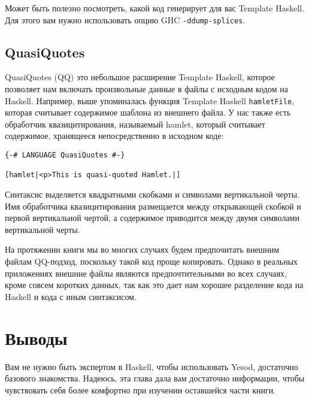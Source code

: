 Может быть полезно посмотреть, какой код генерирует для вас Template Haskell. Для этого вам нужно использовать опцию GHC \texttt{-ddump-splices}.


\subsection{QuasiQuotes}

QuasiQuotes (QQ) это небольшое расширение Template Haskell, которое позволяет нам включать произвольные данные в файлы с исходным кодом на Haskell. Например, выше упоминалась функция Template Haskell \lstinline'hamletFile', которая считывает содержимое шаблона из внешнего файла. У нас также есть обработчик квазицитирования, называемый hamlet, который считывает содержимое, хранящееся непосредственно в исходном коде:

\begin{lstlisting}
{-# LANGUAGE QuasiQuotes #-}

[hamlet|<p>This is quasi-quoted Hamlet.|]
\end{lstlisting}

Синтаксис выделяется квадратными скобками и символами вертикальной черты. Имя обработчика квазицитирования размещается между открывающей скобкой и первой вертикальной чертой, а содержимое приводится между двумя символами вертикальной черты.

На протяжении книги мы во многих случаях будем предпочитать внешним файлам QQ-подход, поскольку такой код проще копировать. Однако в реальных приложениях внешние файлы являются предпочтительными во всех случаях, кроме совсем коротких данных, так как это дает нам хорошее разделение кода на Haskell и кода с иным синтаксисом.

\section{Выводы}

Вам не нужно быть экспертом в Haskell, чтобы использовать Yesod, достаточно базового знакомства. Надеюсь, эта глава дала вам достаточно информации, чтобы чувствовать себя более комфортно при изучении оставшейся части книги.
